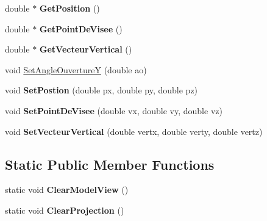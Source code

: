 \begin{DoxyCompactItemize}
double $\ast$ {\bfseries Get\+Position} ()
\item 
\mbox{\label{classAbstractCamera_ab6f6eda4aac279027791a864243d1a49}} 
double $\ast$ {\bfseries Get\+Point\+De\+Visee} ()
\item 
\mbox{\label{classAbstractCamera_aa539cecd54862bfa856c36167e6589c9}} 
double $\ast$ {\bfseries Get\+Vecteur\+Vertical} ()
\item 
void \mbox{\hyperlink{classAbstractCamera_a9da46dd6e5a6dc3c5095419fa6a540b7}{Set\+Angle\+OuvertureY}} (double ao)
\item 
\mbox{\label{classAbstractCamera_abce3fc447411ab866d33c80e3a787425}} 
void {\bfseries Set\+Postion} (double px, double py, double pz)
\item 
\mbox{\label{classAbstractCamera_a89faebec35e419763e06f55f188a80fd}} 
void {\bfseries Set\+Point\+De\+Visee} (double vx, double vy, double vz)
\item 
\mbox{\label{classAbstractCamera_abb1825c3e2f45d01909f6b891e5b7d04}} 
void {\bfseries Set\+Vecteur\+Vertical} (double vertx, double verty, double vertz)
\end{DoxyCompactItemize}
\subsection*{Static Public Member Functions}
\begin{DoxyCompactItemize}
\item 
\mbox{\label{classAbstractCamera_acdc09772d265207659ac34e2a6d1fe4c}} 
static void {\bfseries Clear\+Model\+View} ()
\item 
\mbox{\label{classAbstractCamera_a0abb148e5ab4628730517c50d9d6fa2c}} 
static void {\bfseries Clear\+Projection} ()
\end{DoxyCompactItemize}
